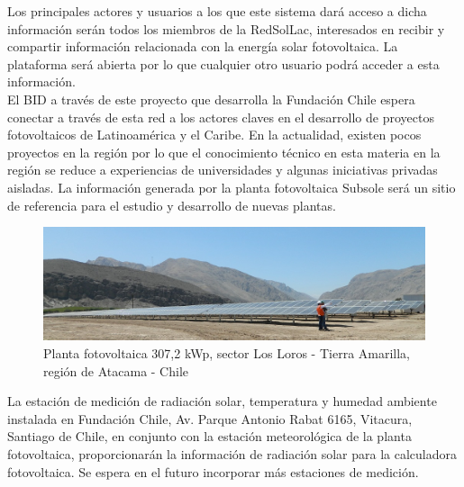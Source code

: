 Los principales actores y usuarios a los que este sistema dará acceso a dicha información serán todos los miembros de la RedSolLac\cite{redSolLac:1}, interesados en recibir y compartir información relacionada con la energía solar fotovoltaica. La plataforma será abierta por lo que cualquier otro usuario podrá acceder a esta información.\\

El BID a través de este proyecto que desarrolla la Fundación Chile espera conectar a través de esta red a los actores claves en el desarrollo de proyectos fotovoltaicos de Latinoamérica y el Caribe. En la actualidad, existen pocos proyectos en la región por lo que el conocimiento técnico en esta materia en la región se reduce a experiencias de universidades y algunas iniciativas privadas aisladas. La información generada por la planta fotovoltaica Subsole será un sitio de referencia para el estudio y desarrollo de nuevas plantas.\\

\begin{figure}[h!]
        \centering
        \includegraphics[scale=0.4]{images/plantaSubSoleLorosAmarilla}
        \caption{Planta fotovoltaica 307,2 kWp, sector Los Loros - Tierra Amarilla, región de Atacama - Chile}
\end{figure}

La estación de medición de radiación solar, temperatura y humedad ambiente instalada en Fundación Chile, Av. Parque Antonio Rabat 6165, Vitacura, Santiago de Chile, en conjunto con la estación meteorológica de la planta fotovoltaica, proporcionarán la información de radiación solar para la calculadora fotovoltaica. Se espera en el futuro incorporar más estaciones de medición.\\

